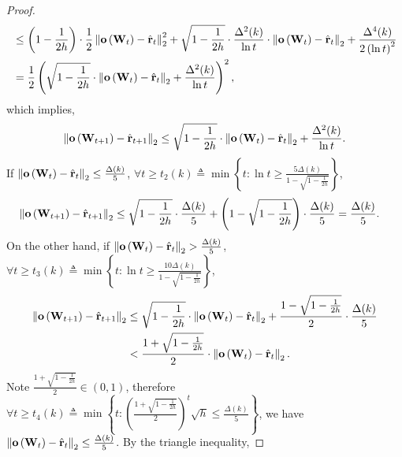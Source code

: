 \begin{proof}
\begin{equation*}
\begin{split}
	&\le \left( 1 - \frac{1}{2 h} \right) \cdot \frac{1}{2} \left\| {\mathbf{o}}\left( {\mathbf{W}}_t \right) - \hat{{\mathbf{r}}}_t\right\|_2^2 + \sqrt{1 - \frac{1}{2 h} } \cdot \frac{\Delta^2(k)}{\ln{t}} \cdot \left\| {\mathbf{o}}\left( {\mathbf{W}}_t \right) - \hat{{\mathbf{r}}}_t\right\|_2 + \frac{\Delta^4(k)}{2 \left( \ln{t} \right)^2 } \\
	&= \frac{1}{2} \left( \sqrt{1 - \frac{1}{2 h} } \cdot \left\| {\mathbf{o}}\left( {\mathbf{W}}_t \right) - \hat{{\mathbf{r}}}_t\right\|_2 + \frac{\Delta^2(k)}{\ln{t}} \right)^2,
	\end{split}
	\end{equation*}
	which implies,
	\begin{equation*}
	    \left\| {\mathbf{o}}\left( {\mathbf{W}}_{t+1} \right) - \hat{{\mathbf{r}}}_{t+1}\right\|_2 \le \sqrt{1 - \frac{1}{2 h} } \cdot \left\| {\mathbf{o}}\left( {\mathbf{W}}_t \right) - \hat{{\mathbf{r}}}_t\right\|_2 + \frac{\Delta^2(k)}{\ln{t}}.
	\end{equation*}
	If $\left\| {\mathbf{o}}\left( {\mathbf{W}}_t \right) - \hat{{\mathbf{r}}}_t\right\|_2 \le \frac{\Delta(k)}{5}$, $\forall t \ge t_2(k) \triangleq \min\left\{ t: \ln{t} \ge \frac{5 \Delta(k) }{1 - \sqrt{1 - \frac{1}{2 h}}} \right\}$,
	\begin{equation*}
	\begin{split}
	\left\| {\mathbf{o}}\left( {\mathbf{W}}_{t+1} \right) - \hat{{\mathbf{r}}}_{t+1}\right\|_2 &\le \sqrt{1 - \frac{1}{2 h}} \cdot \frac{\Delta(k)}{5} + \left(1 - \sqrt{1 - \frac{1}{2 h}}\right) \cdot \frac{\Delta(k)}{5} = \frac{\Delta(k)}{5}.
	\end{split}
	\end{equation*}
	On the other hand, if $\left\| {\mathbf{o}}\left( {\mathbf{W}}_t \right) - \hat{{\mathbf{r}}}_t\right\|_2 > \frac{\Delta(k)}{5}$, $\forall t \ge t_3(k) \triangleq \min\left\{ t: \ln{t} \ge \frac{10 \Delta(k)}{1 - \sqrt{1 - \frac{1}{2 h}}} \right\}$,
	\begin{equation*}
	\begin{split}
	\left\| {\mathbf{o}}\left( {\mathbf{W}}_{t+1} \right) - \hat{{\mathbf{r}}}_{t+1}\right\|_2 &\le \sqrt{1 - \frac{1}{2 h}} \cdot \left\| {\mathbf{o}}\left( {\mathbf{W}}_t \right) - \hat{{\mathbf{r}}}_t\right\|_2 + \frac{1 - \sqrt{1 - \frac{1}{2 h}}}{2} \cdot \frac{\Delta(k)}{5} \\
	&< \frac{1 + \sqrt{1 - \frac{1}{2 h}}}{2} \cdot \left\| {\mathbf{o}}\left( {\mathbf{W}}_t \right) - \hat{{\mathbf{r}}}_t\right\|_2.
	\end{split}
	\end{equation*}
	Note $\frac{1 + \sqrt{1 - \frac{1}{2 h}}}{2} \in \left(0, 1\right)$, therefore $\forall t \ge t_4(k) \triangleq \min{\left\{ t : \left( \frac{1 + \sqrt{1 - \frac{1}{2 h}}}{2} \right)^t \sqrt{h} \le \frac{\Delta(k)}{5}  \right\}}$, we have $\left\| {\mathbf{o}}\left( {\mathbf{W}}_t \right) - \hat{{\mathbf{r}}}_t\right\|_2 \le \frac{\Delta(k)}{5}$. By the triangle inequality,

\end{proof}

